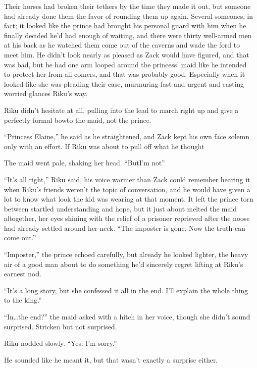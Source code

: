Their horses had broken their tethers by the time they made it out, but someone had already done them the favor of rounding them up again. Several someones, in fact; it looked like the prince had brought his personal guard with him when he finally decided he'd had enough of waiting, and there were thirty well-armed men at his back as he watched them come out of the caverns and wade the ford to meet him. He didn't look nearly as pleased as Zack would have figured, and that was bad, but he had one arm looped around the princess' maid like he intended to protect her from all comers, and that was probably good. Especially when it looked like she was pleading their case, murmuring fast and urgent and casting worried glances Riku's way.

Riku didn't hesitate at all, pulling into the lead to march right up and give a perfectly formal bow\textemdash to the maid, not the prince.

``Princess Elaine,'' he said as he straightened, and Zack kept his own face solemn only with an effort. If Riku was about to pull off what he thought\textemdash 

The maid went pale, shaking her head. ``But\textemdash I'm not\textemdash ''

``It's all right,'' Riku said, his voice warmer than Zack could remember hearing it when Riku's friends weren't the topic of conversation, and he would have given a lot to know what look the kid was wearing at that moment. It left the prince torn between startled understanding and hope, but it just about melted the maid altogether, her eyes shining with the relief of a prisoner reprieved after the noose had already settled around her neck. ``The imposter is gone. Now the truth can come out.''

``Imposter,'' the prince echoed carefully, but already he looked lighter, the heavy air of a good man about to do something he'd sincerely regret lifting at Riku's earnest nod.

``It's a long story, but she confessed it all in the end. I'll explain the whole thing to the king.''

``In\ldots the end?'' the maid asked with a hitch in her voice, though she didn't sound surprised. Stricken but not surprised.

Riku nodded slowly. ``Yes. I'm sorry.''

He sounded like he meant it, but that wasn't exactly a surprise either.


\scenechange


